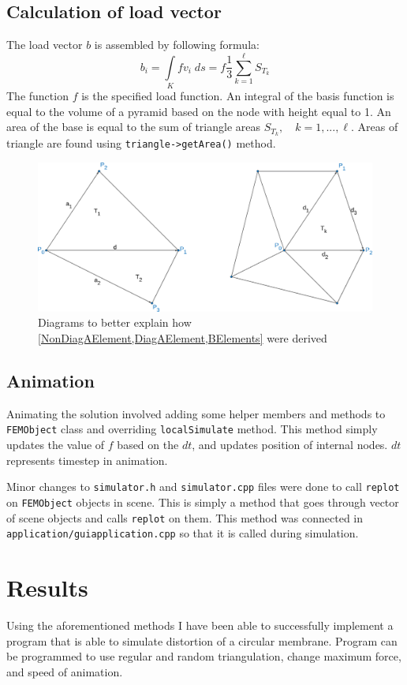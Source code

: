 \documentclass[a4,10pt]{article}
\newcommand{\Int}{\int\limits}
\begin{document}
\subsection{Calculation of load vector}
The load vector $b$ is assembled by following formula:
\begin{equation} \label{BElements}
b_i = \Int_{K}fv_i \; ds = f \frac{1}{3} \sum_{k = 1}^{\ell}S_{T_k}
\end{equation}
The function $f$ is the specified load function. An integral of the basis function is equal to the volume of a pyramid based on the node with height equal to 1. An area of the base is equal to the sum of triangle areas $S_{T_k}, \quad k = 1,...,\ell$. Areas of triangle are found using \verb|triangle->getArea()| method.

\begin{figure}[H]
  \centering
  \includegraphics[width=.75\textwidth]{Triangles}
  \caption{Diagrams to better explain how \cref{NonDiagAElement,DiagAElement,BElements} were derived}\label{Triangles}
\end{figure}

\subsection{Animation}
Animating the solution involved adding some helper members and methods to \verb|FEMObject| class and overriding \verb|localSimulate| method. This method simply updates the value of $f$ based on the $dt$, and updates position of internal nodes. $dt$ represents timestep in animation. 

Minor changes to \verb|simulator.h| and \verb|simulator.cpp| files were done to call \verb|replot| on \verb|FEMObject| objects in scene. This is simply a method that goes through vector of scene objects and calls \verb|replot| on them. This method was connected in \verb|application/guiapplication.cpp| so that it is called during simulation.

\section{Results}
Using the aforementioned methods I have been able to successfully implement a program that is able to simulate distortion of a circular membrane. Program can be programmed to use regular and random triangulation, change maximum force, and speed of animation.
\end{document}
